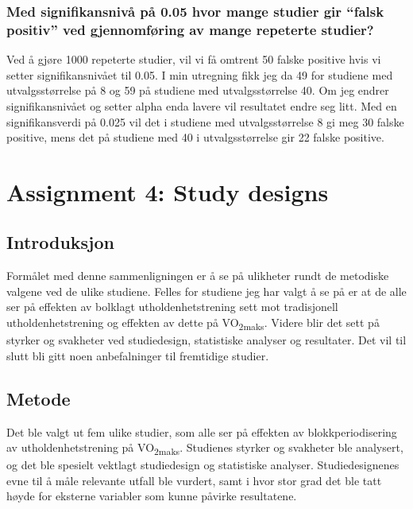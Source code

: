 \documentclass[
  letterpaper,
  DIV=11,
  numbers=noendperiod]{scrreprt}
\begin{document}
\subsection{Med signifikansnivå på 0.05 hvor mange studier gir ``falsk
positiv'' ved gjennomføring av mange repeterte
studier?}\label{med-signifikansnivuxe5-puxe5-0.05-hvor-mange-studier-gir-falsk-positiv-ved-gjennomfuxf8ring-av-mange-repeterte-studier}

Ved å gjøre 1000 repeterte studier, vil vi få omtrent 50 falske positive
hvis vi setter signifikansnivået til 0.05. I min utregning fikk jeg da
49 for studiene med utvalgsstørrelse på 8 og 59 på studiene med
utvalgsstørrelse 40. Om jeg endrer signifikansnivået og setter alpha
enda lavere vil resultatet endre seg litt. Med en signifikansverdi på
0.025 vil det i studiene med utvalgsstørrelse 8 gi meg 30 falske
positive, mens det på studiene med 40 i utvalgsstørrelse gir 22 falske
positive.


\chapter{Assignment 4: Study designs}\label{assignment-4-study-designs}

\section{Introduksjon}\label{introduksjon-3}

Formålet med denne sammenligningen er å se på ulikheter rundt de
metodiske valgene ved de ulike studiene. Felles for studiene jeg har
valgt å se på er at de alle ser på effekten av bolklagt
utholdenhetstrening sett mot tradisjonell utholdenhetstrening og
effekten av dette på VO\textsubscript{2maks}. Videre blir det sett på
styrker og svakheter ved studiedesign, statistiske analyser og
resultater. Det vil til slutt bli gitt noen anbefalninger til fremtidige
studier.

\section{Metode}\label{metode-4}

Det ble valgt ut fem ulike studier, som alle ser på effekten av
blokkperiodisering av utholdenhetstrening på VO\textsubscript{2maks}.
Studienes styrker og svakheter ble analysert, og det ble spesielt
vektlagt studiedesign og statistiske analyser. Studiedesignenes evne til
å måle relevante utfall ble vurdert, samt i hvor stor grad det ble tatt
høyde for eksterne variabler som kunne påvirke resultatene.
\end{document}
